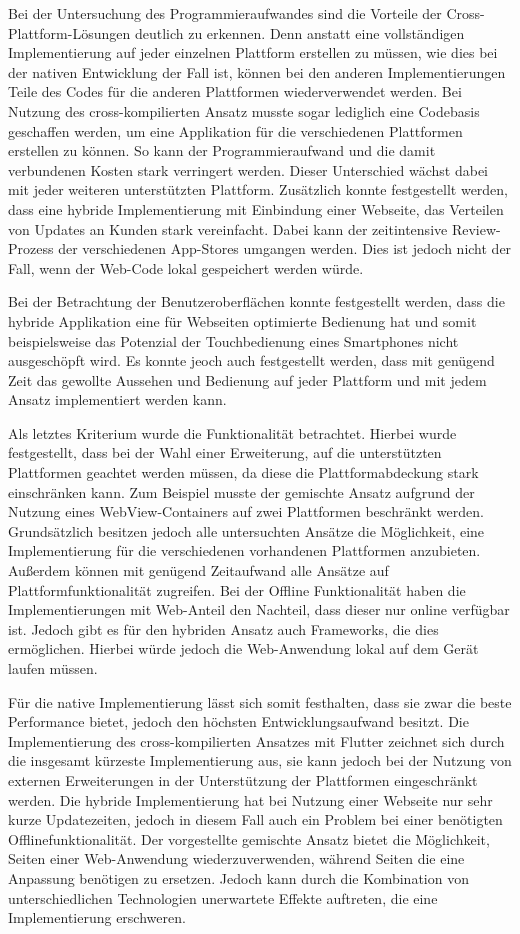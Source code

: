 Bei der Untersuchung des Programmieraufwandes sind die Vorteile der Cross-Plattform-Lösungen deutlich zu erkennen. Denn anstatt eine vollständigen Implementierung auf jeder einzelnen Plattform erstellen zu müssen, wie dies bei der nativen Entwicklung der Fall ist, können bei den anderen Implementierungen Teile des Codes für die anderen Plattformen wiederverwendet werden. Bei Nutzung des cross-kompilierten Ansatz musste sogar lediglich eine Codebasis geschaffen werden, um eine Applikation für die verschiedenen Plattformen erstellen zu können. So kann der Programmieraufwand und die damit verbundenen Kosten stark verringert werden. Dieser Unterschied wächst dabei mit jeder weiteren unterstützten Plattform.
Zusätzlich konnte festgestellt werden, dass eine hybride Implementierung mit Einbindung einer Webseite, das Verteilen von Updates an Kunden stark vereinfacht. Dabei kann der zeitintensive Review-Prozess der verschiedenen App-Stores umgangen werden. Dies ist jedoch nicht der Fall, wenn der Web-Code lokal gespeichert werden würde.

Bei der Betrachtung der Benutzeroberflächen konnte festgestellt werden, dass die hybride Applikation eine für Webseiten optimierte Bedienung hat und somit beispielsweise das Potenzial der Touchbedienung eines Smartphones nicht ausgeschöpft wird. Es konnte jeoch auch festgestellt werden, dass mit genügend Zeit das gewollte Aussehen und Bedienung auf jeder Plattform und mit jedem Ansatz implementiert werden kann.

Als letztes Kriterium wurde die Funktionalität betrachtet. Hierbei wurde festgestellt, dass bei der Wahl einer Erweiterung, auf die unterstützten Plattformen geachtet werden müssen, da diese die Plattformabdeckung stark einschränken kann. Zum Beispiel musste der gemischte Ansatz aufgrund der Nutzung eines WebView-Containers auf zwei Plattformen beschränkt werden. Grundsätzlich besitzen jedoch alle untersuchten Ansätze die Möglichkeit, eine Implementierung für die verschiedenen vorhandenen Plattformen anzubieten. Außerdem können mit genügend Zeitaufwand alle Ansätze auf Plattformfunktionalität  zugreifen. Bei der Offline Funktionalität haben die Implementierungen mit Web-Anteil den Nachteil, dass dieser nur online verfügbar ist. Jedoch gibt es für den hybriden Ansatz auch Frameworks,  die dies ermöglichen. Hierbei würde jedoch die Web-Anwendung lokal auf dem Gerät laufen müssen.

Für die native Implementierung lässt sich somit festhalten, dass sie zwar die beste Performance bietet, jedoch den höchsten Entwicklungsaufwand besitzt.
Die Implementierung des cross-kompilierten Ansatzes mit Flutter zeichnet sich durch die insgesamt kürzeste Implementierung aus, sie kann jedoch bei der Nutzung von externen Erweiterungen in der Unterstützung der Plattformen eingeschränkt werden. Die hybride Implementierung hat bei Nutzung einer Webseite nur sehr kurze Updatezeiten, jedoch in diesem Fall auch ein Problem bei einer benötigten Offlinefunktionalität. Der vorgestellte gemischte Ansatz bietet die Möglichkeit, Seiten einer Web-Anwendung wiederzuverwenden, während Seiten die eine Anpassung benötigen zu ersetzen. Jedoch kann durch die Kombination von unterschiedlichen Technologien unerwartete Effekte auftreten, die eine Implementierung erschweren.


